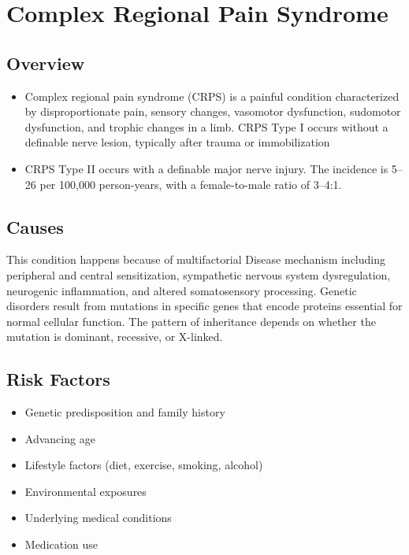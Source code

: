 \chapter{Complex Regional Pain Syndrome}
\label{sec:Complex Regional Pain Syndrome}

\section{Overview}


\begin{itemize}[noitemsep]
  \item Complex regional pain syndrome (CRPS) is a painful condition characterized by disproportionate pain, sensory changes, vasomotor dysfunction, sudomotor dysfunction, and trophic changes in a limb. CRPS Type I occurs without a definable nerve lesion, typically after trauma or immobilization
  \item CRPS Type II occurs with a definable major nerve injury. The incidence is 5--26 per 100,000 person-years, with a female-to-male ratio of 3--4:1.
\end{itemize}
\section{Causes}
This condition happens because of multifactorial Disease mechanism including peripheral and central sensitization, sympathetic nervous system dysregulation, neurogenic inflammation, and altered somatosensory processing. Genetic disorders result from mutations in specific genes that encode proteins essential for normal cellular function. The pattern of inheritance depends on whether the mutation is dominant, recessive, or X-linked.   
\section{Risk Factors}

\begin{itemize}[noitemsep]
  \item Genetic predisposition and family history
  \item Advancing age
  \item Lifestyle factors (diet, exercise, smoking, alcohol)
  \item Environmental exposures
  \item Underlying medical conditions
  \item Medication use
\end{itemize}
